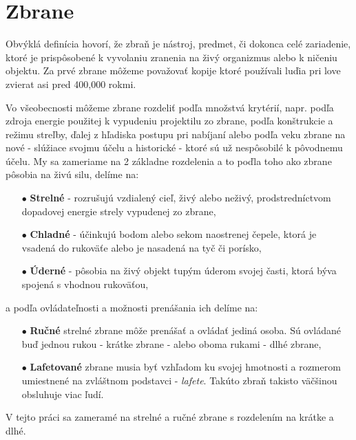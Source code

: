
\section{Zbrane}

Obvýklá definícia hovorí, že zbraň je nástroj, predmet, či dokonca celé zariadenie,
ktoré je prispôsobené k vyvolaniu zranenia na živý organizmus alebo k ničeniu objektu\cite{book:StrelneZbrane}.
Za prvé zbrane môžeme považovať kopije ktoré používali luďia pri love zvierat asi pred 400,000 rokmi\cite{prop:SpearHistory}.

Vo všeobecnosti môžeme zbrane rozdeliť podľa množstvá krytérií, napr. podľa zdroja energie použitej k vypudeniu projektilu zo zbrane,
podľa konštrukcie a režimu streľby, ďalej z hľadiska postupu pri nabíjaní alebo podľa veku zbrane na nové - slúžiace svojmu účelu a historické - ktoré sú už nespôsobilé k pôvodnemu účelu.
My sa zameriame na 2 základne rozdelenia a to poďla toho ako zbrane pôsobia na živú silu, delíme na\cite{book:StrelneZbrane}:
\begin{enumerate}
	\item[$\bullet$] \textbf{Strelné} - rozrušujú vzdialený cieľ, živý alebo neživý, prodstredníctvom dopadovej energie strely vypudenej zo zbrane,
	\item[$\bullet$] \textbf{Chladné} - účinkujú bodom alebo sekom naostrenej čepele, ktorá je vsadená do rukoväťe alebo je nasadená na tyč či porísko,
    \item[$\bullet$] \textbf{Úderné} - pôsobia na živý objekt tupým úderom svojej časti, ktorá býva spojená s vhodnou rukoväťou,
\end{enumerate}
a podľa ovládateľnosti a možnosti prenášania ich delíme na\cite{book:StrelneZbrane}:
\begin{enumerate}
	\item[$\bullet$] \textbf{Ručné} strelné zbrane môže prenášať a ovládať jediná osoba. Sú ovládané buď jednou rukou - krátke zbrane - alebo oboma rukami - dlhé zbrane,
	\item[$\bullet$] \textbf{Lafetované} zbrane musia byť vzhľadom ku svojej hmotnosti a rozmerom umiestnené na zvláštnom podstavci - \textit{lafete}. Takúto zbraň takisto väčšinou obsluhuje viac ľudí.
\end{enumerate}
V tejto práci sa zameramé na strelné a ručné zbrane s rozdelením na krátke a dlhé.
